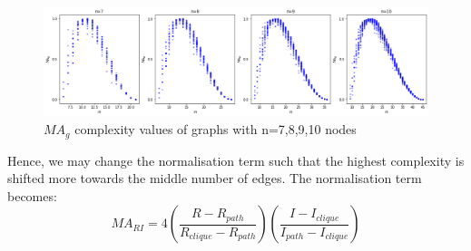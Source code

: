 \documentclass[12pt]{article}
\begin{document}
\begin{figure}[ht]
    \includegraphics[width=\textwidth]{mag.png}
    \centering
    \caption{$MA_g$ complexity values of graphs with n=7,8,9,10 nodes}
    \label{fig:mag}
\end{figure}
\noindent
Hence, we may change the normalisation term such that the highest complexity is shifted more towards the middle number of edges. The normalisation term becomes:
\begin{equation}
    \label{eq:mari}
    MA_{RI} = 4(\frac{R-R_{path}}{R_{clique}-R_{path}})(\frac{I-I_{clique}}{I_{path}-I_{clique}})
\end{equation}
\end{document}
